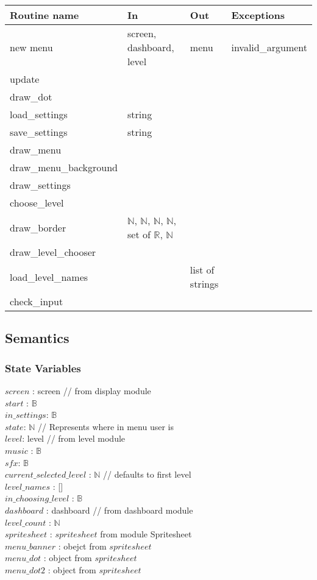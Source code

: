 \documentclass[12pt]{article}
\begin{document}
\begin{tabular}{| l | l | l | l |}
\hline
\textbf{Routine name} & \textbf{In} & \textbf{Out} & \textbf{Exceptions}\\
\hline
new menu & screen, dashboard, level & menu & invalid\_argument\\
\hline
update & & & \\
\hline
draw\_dot & & & \\
\hline
load\_settings & string & & \\
\hline
save\_settings & string & & \\
\hline
draw\_menu & & & \\
\hline
draw\_menu\_background & & & \\
\hline
draw\_settings & & & \\
\hline
choose\_level & & & \\
\hline
draw\_border & $\mathbb{N}$, $\mathbb{N}$, $\mathbb{N}$, $\mathbb{N}$, set of $\mathbb{R}$, $\mathbb{N}$ & & \\
\hline
draw\_level\_chooser & & & \\
\hline
load\_level\_names & & list of strings & \\
\hline
check\_input & & & \\
\hline
\end{tabular}

\subsection* {Semantics}

\subsubsection* {State Variables}

$screen$ : screen // from display module\\
$start$ : $\mathbb{B}$ \\
$in\_settings$: $\mathbb{B}$ \\
$state$: $\mathbb{N}$ // Represents where in menu user is\\
$level$: level // from level module\\
$music$ : $\mathbb{B}$ \\
$sfx$: $\mathbb{B}$ \\
$current\_selected\_level$ : $\mathbb{N}$ // defaults to first level\\
$level\_names$ : [] \\
$in\_choosing\_level$ : $\mathbb{B}$ \\
$dashboard$ : dashboard // from dashboard module\\
$level\_count$ : $\mathbb{N}$ \\
$spritesheet$ : $spritesheet$ from module Spritesheet \\
$menu\_banner$ : obejct from $spritesheet$ \\
$menu\_dot$ : object from $spritesheet$ \\
$menu\_dot2$ : object from $spritesheet$
\end{document}
